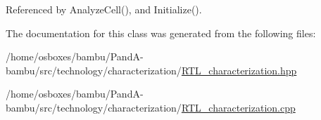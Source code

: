 Referenced by Analyze\+Cell(), and Initialize().



The documentation for this class was generated from the following files\+:\begin{DoxyCompactItemize}
\item 
/home/osboxes/bambu/\+Pand\+A-\/bambu/src/technology/characterization/\hyperlink{RTL__characterization_8hpp}{R\+T\+L\+\_\+characterization.\+hpp}\item 
/home/osboxes/bambu/\+Pand\+A-\/bambu/src/technology/characterization/\hyperlink{RTL__characterization_8cpp}{R\+T\+L\+\_\+characterization.\+cpp}\end{DoxyCompactItemize}

